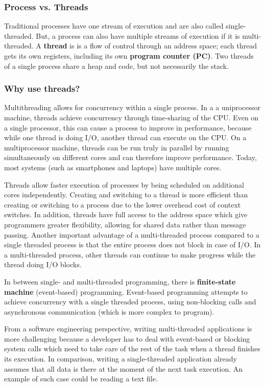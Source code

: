 \documentclass[twoside]{article}
\begin{document}
\subsubsection{Process vs. Threads}
Traditional processes have one stream of execution and are also called single-threaded. But, a process can also have multiple streams of execution if it is multi-threaded. A \textbf{thread} is is a flow of control through an address space; each thread gets its own registers, including its own \textbf{program counter (PC)}. Two threads of a single process share a heap and code, but not necessarily the stack. 

\subsubsection{Why use threads?}
Multithreading allows for concurrency within a single process. In a a uniprocessor machine, threads achieve concurrency through time-sharing of the CPU. Even on a single processor, this can cause a process to improve in performance, because while one thread is doing I/O, another thread can execute on the CPU. On a multiprocessor machine, threads can be run truly in parallel by running simultaneously on different cores and can therefore improve performance. Today, most systems (such as smartphones and laptops) have multiple cores.

Threads allow faster execution of processes by being scheduled on additional cores independently. Creating and switching to a thread is more efficient than creating or switching to a process due to the lower overhead cost of context switches. In addition, threads have full access to the address space which give programmers greater flexibility, allowing for shared data rather than message passing. Another important advantage of a multi-threaded process compared to a single threaded process is that the entire process does not block in case of I/O. In a multi-threaded process, other threads can continue to make progress while the thread doing I/O blocks. 

In between single- and multi-threaded programming, there is \textbf{finite-state machine} (event-based) programming. Event-based programming attempts to achieve concurrency with a single threaded process, using non-blocking calls and asynchronous communication (which is more complex to program).

From a software engineering perspective, writing multi-threaded applications is more challenging because a developer has to deal with event-based or blocking system calls which need to take care of the rest of the task when a thread finishes its execution. In comparison, writing a single-threaded application already assumes that all data is there at the moment of the next task execution. An example of such case could be reading a text file. 
\end{document}
